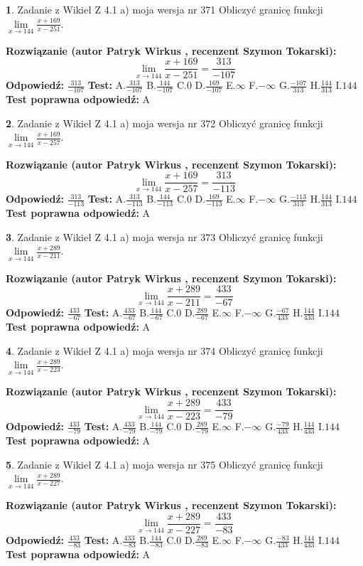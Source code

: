 \documentclass[12pt, a4paper]{article}
\theoremstyle{definition} %
\newtheorem{zad}{}
\newcommand{\zadStart}[1]{\begin{zad}#1\newline}
\newcommand{\zadStop}{\end{zad}}
\newcommand{\rozwStart}[2]{\noindent \textbf{Rozwiązanie (autor #1 , recenzent #2): }\newline}
\newcommand{\rozwStop}{\newline}
\newcommand{\odpStart}{\noindent \textbf{Odpowiedź:}\newline}
\newcommand{\odpStop}{\newline}
\newcommand{\testStart}{\noindent \textbf{Test:}\newline}
\newcommand{\testStop}{\newline}
\newcommand{\kluczStart}{\noindent \textbf{Test poprawna odpowiedź:}\newline}
\newcommand{\kluczStop}{\newline}
\begin{document}
\zadStart{Zadanie z Wikieł Z 4.1 a) moja wersja nr 371}
Obliczyć granicę funkcji $\lim\limits_{x\to144}\frac{x+169}{x-251}$.
\zadStop
\rozwStart{Patryk Wirkus}{Szymon Tokarski}
$$\lim\limits_{x\to144}\frac{x+169}{x-251} = \frac{313}{-107}$$
\rozwStop
\odpStart
$\frac{313}{-107}$
\odpStop
\testStart
A.$\frac{313}{-107}$
B.$\frac{144}{-107}$
C.$0$
D.$\frac{169}{-107}$
E.$\infty$
F.$-\infty$
G.$\frac{-107}{313}$
H.$\frac{144}{313}$
I.$144$
\testStop
\kluczStart
A
\kluczStop



\zadStart{Zadanie z Wikieł Z 4.1 a) moja wersja nr 372}
Obliczyć granicę funkcji $\lim\limits_{x\to144}\frac{x+169}{x-257}$.
\zadStop
\rozwStart{Patryk Wirkus}{Szymon Tokarski}
$$\lim\limits_{x\to144}\frac{x+169}{x-257} = \frac{313}{-113}$$
\rozwStop
\odpStart
$\frac{313}{-113}$
\odpStop
\testStart
A.$\frac{313}{-113}$
B.$\frac{144}{-113}$
C.$0$
D.$\frac{169}{-113}$
E.$\infty$
F.$-\infty$
G.$\frac{-113}{313}$
H.$\frac{144}{313}$
I.$144$
\testStop
\kluczStart
A
\kluczStop



\zadStart{Zadanie z Wikieł Z 4.1 a) moja wersja nr 373}
Obliczyć granicę funkcji $\lim\limits_{x\to144}\frac{x+289}{x-211}$.
\zadStop
\rozwStart{Patryk Wirkus}{Szymon Tokarski}
$$\lim\limits_{x\to144}\frac{x+289}{x-211} = \frac{433}{-67}$$
\rozwStop
\odpStart
$\frac{433}{-67}$
\odpStop
\testStart
A.$\frac{433}{-67}$
B.$\frac{144}{-67}$
C.$0$
D.$\frac{289}{-67}$
E.$\infty$
F.$-\infty$
G.$\frac{-67}{433}$
H.$\frac{144}{433}$
I.$144$
\testStop
\kluczStart
A
\kluczStop



\zadStart{Zadanie z Wikieł Z 4.1 a) moja wersja nr 374}
Obliczyć granicę funkcji $\lim\limits_{x\to144}\frac{x+289}{x-223}$.
\zadStop
\rozwStart{Patryk Wirkus}{Szymon Tokarski}
$$\lim\limits_{x\to144}\frac{x+289}{x-223} = \frac{433}{-79}$$
\rozwStop
\odpStart
$\frac{433}{-79}$
\odpStop
\testStart
A.$\frac{433}{-79}$
B.$\frac{144}{-79}$
C.$0$
D.$\frac{289}{-79}$
E.$\infty$
F.$-\infty$
G.$\frac{-79}{433}$
H.$\frac{144}{433}$
I.$144$
\testStop
\kluczStart
A
\kluczStop



\zadStart{Zadanie z Wikieł Z 4.1 a) moja wersja nr 375}
Obliczyć granicę funkcji $\lim\limits_{x\to144}\frac{x+289}{x-227}$.
\zadStop
\rozwStart{Patryk Wirkus}{Szymon Tokarski}
$$\lim\limits_{x\to144}\frac{x+289}{x-227} = \frac{433}{-83}$$
\rozwStop
\odpStart
$\frac{433}{-83}$
\odpStop
\testStart
A.$\frac{433}{-83}$
B.$\frac{144}{-83}$
C.$0$
D.$\frac{289}{-83}$
E.$\infty$
F.$-\infty$
G.$\frac{-83}{433}$
H.$\frac{144}{433}$
I.$144$
\testStop
\kluczStart
A
\kluczStop
\end{document}
